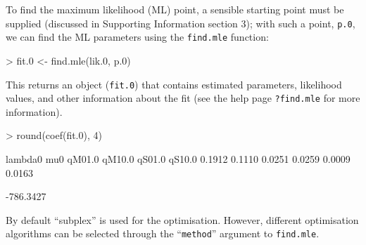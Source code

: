 \documentclass[12pt]{article}
\newenvironment{Schunk}{}{}
\newcommand\code\texttt
\begin{document}
To find the maximum likelihood (ML) point, a sensible starting point
must be supplied (discussed in Supporting Information section 3); with such a
point, \code{p.0}, we can find the ML parameters using the
\code{find.mle} function:
\begin{Schunk}
\begin{Sinput}
> fit.0 <- find.mle(lik.0, p.0)
\end{Sinput}
\end{Schunk}
%
This returns an object (\code{fit.0}) that contains estimated
parameters, likelihood values, and other information about the fit
(see the help page \code{?find.mle} for more information).
\begin{Schunk}
\begin{Sinput}
> round(coef(fit.0), 4)
\end{Sinput}
\begin{Soutput}
lambda0     mu0  qM01.0  qM10.0  qS01.0  qS10.0 
 0.1912  0.1110  0.0251  0.0259  0.0009  0.0163 
\end{Soutput}
%$ %-- for emacs
\begin{Soutput}
[1] -786.3427
\end{Soutput}
\end{Schunk}
By default ``subplex'' \citep{subplex} is used for the optimisation.
However, different optimisation algorithms can be selected through the
``\code{method}'' argument to \code{find.mle}.
\end{document}
